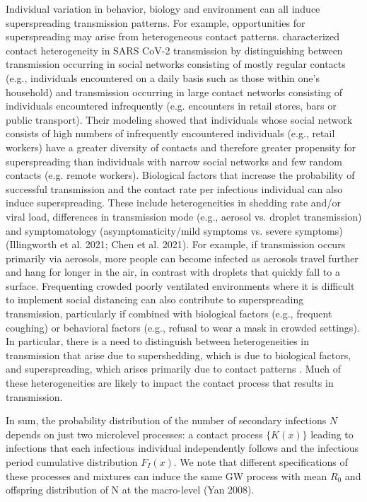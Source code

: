 \documentclass{imammb}
\numberwithin{equation}{section}
\begin{document}
Individual variation in behavior, biology and environment can all induce superspreading transmission patterns. For example, opportunities for superspreading may arise from heterogeneous contact patterns.\citet{Sneppen2021-mr} characterized contact heterogeneity in SARS CoV-2 transmission by distinguishing between transmission occurring in social networks consisting of mostly regular contacts (e.g., individuals encountered on a daily basis such as those within one’s household) and transmission occurring in large contact networks consisting of individuals encountered infrequently (e.g. encounters in retail stores, bars or public transport). Their modeling showed that individuals whose social network consists of high numbers of infrequently encountered individuals (e.g., retail workers) have a greater diversity of contacts and therefore greater propensity for superspreading than individuals with narrow social networks and few random contacts (e.g. remote workers). Biological factors that increase the probability of successful transmission and the contact rate per infectious individual can also induce superspreading. These include heterogeneities in shedding rate and/or viral load, differences in transmission mode (e.g., aerosol vs. droplet transmission) and symptomatology (asymptomaticity/mild symptoms vs. severe symptoms) \citep{Chen2021-nx, Chen2021-wo}(Illingworth et al. 2021; Chen et al. 2021). For example, if transmission occurs primarily via aerosols, more people can become infected as aerosols travel further and hang for longer in the air, in contrast with droplets that quickly fall to a surface. Frequenting crowded poorly ventilated environments where it is difficult to implement social distancing can also contribute to superspreading transmission, particularly if combined with biological factors (e.g., frequent coughing) or behavioral factors (e.g., refusal to wear a mask in crowded settings). In particular, there is a need to distinguish between heterogeneities in transmission that arise due to supershedding, which is due to biological factors, and superspreading, which arises primarily due to contact patterns \citep{Rock2014-nc}. Much of these heterogeneities are likely to impact the contact process that results in transmission.

In sum, the probability distribution of the number of secondary infections $N$ depends on just two microlevel processes: a contact process $\{K(x)\}$ leading to infections that each infectious individual independently follows and the infectious period cumulative distribution $F_I(x)$. We note that different specifications of these processes and mixtures can induce the same GW process with mean $R_0$ and offspring distribution of N at the macro-level (Yan 2008).
\end{document}
